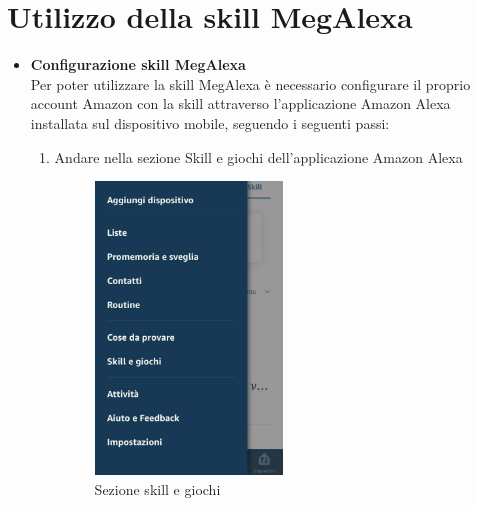 \section{Utilizzo della skill MegAlexa}

\begin{itemize}
\item  \textbf{Configurazione skill MegAlexa}\\
Per poter utilizzare la skill MegAlexa è necessario configurare il proprio account Amazon con la skill  attraverso l'applicazione Amazon Alexa installata sul dispositivo mobile, seguendo i seguenti passi:
\begin{enumerate}
	\item  Andare nella sezione Skill e giochi dell'applicazione Amazon Alexa 
	
	\begin{figure}[!ht]
		\centering
		\includegraphics[width=0.5\textwidth]{images/SkillGiochi.png}
		\caption{Sezione skill e giochi}
	\end{figure}
\newpage
	

\end{enumerate}
\end{itemize}
